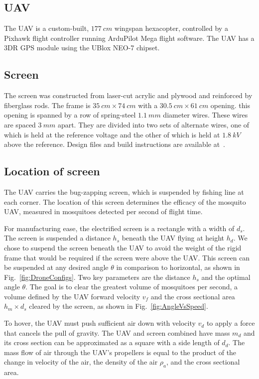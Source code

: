 \documentclass[letterpaper, 10 pt, conference]{ieeeconf}  %
\begin{document}
  \subsection{UAV}
  
The UAV is a custom-built, $177~cm$ wingspan hexacopter, controlled by a Pixhawk flight controller running ArduPilot Mega flight software. The UAV has a 3DR GPS module using the UBlox NEO-7 chipset.

  \subsection{Screen}
  
  The screen was constructed from laser-cut acrylic and plywood and reinforced by fiberglass rods.  The frame is $35~cm \times 74~cm$ with a $30.5~cm \times 61~cm$  opening.  
  this opening is spanned by a row of spring-steel $1.1~mm$ diameter wires.  These wires are spaced $3~mm$ apart.  They are divided into two sets of alternate wires, one of which is held at the reference voltage and the other of which is held at $1.8~kV$ above the reference. Design files and build instructions are available at~\cite{Vinh2016BugNet}.


  \subsection{Location of screen}
 The UAV carries the bug-zapping screen, which is suspended by fishing line at each corner.  The location of this screen determines the efficacy of the mosquito UAV, measured in mosquitoes detected per second of flight time.

For manufacturing ease, the electrified screen is a rectangle with a width of $d_s$. The screen is suspended a distance $h_s$ beneath the UAV flying at height $h_d$.  We chose to suspend the screen beneath the UAV to avoid the weight of the rigid frame that would be required if the screen were above the UAV.  This screen can be suspended at any desired angle $\theta$ in comparison to horizontal, as shown in Fig.~\ref{fig:DroneConfigs}.
Two key parameters are the distance $h_s$ and the optimal angle $\theta$.  The goal is to clear the greatest volume of mosquitoes per second, a volume defined by the UAV forward velocity $v_f$ and the cross sectional area $h_m \times d_s$ cleared by the screen, as shown in Fig.~\ref{fig:AngleVsSpeed}.

 To hover, the UAV must push sufficient air down with velocity $v_d$ to apply a force that cancels the pull of gravity.  The UAV and screen combined have mass $m_{d}$ and its cross section can be approximated as a square with a side length of $d_d$.  The mass flow of air through the UAV's propellers is equal to the product of the change in velocity of the air, the density of the air $\rho_a$, and the cross sectional area.
 
\end{document}

